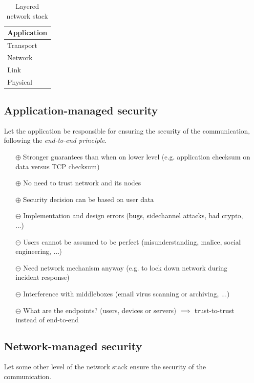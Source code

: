 \begin{table}[h]
\centering
\begin{tabular}{|l|}
\hline
Application \\ \hline
Transport \\ \hline
Network \\ \hline
Link \\ \hline
Physical \\
\hline
\end{tabular}
\caption{Layered network stack}
\end{table}


\subsection{Application-managed security}

Let the application be responsible for ensuring the security of the communication, following the \emph{end-to-end principle}.

\begin{itemize}
    \item[$\oplus$] Stronger guarantees than when on lower level (e.g. application checksum on data versus TCP checksum)
    \item[$\oplus$] No need to trust network and its nodes
    \item[$\oplus$] Security decision can be based on user data
    
    \item[$\ominus$] Implementation and design errors (bugs, sidechannel attacks, bad crypto, ...)
    \item[$\ominus$] Users cannot be assumed to be perfect (misunderstanding, malice, social engineering, ...)
    \item[$\ominus$] Need network mechanism anyway (e.g. to lock down network during incident response)
    \item[$\ominus$] Interference with middleboxes (email virus scanning or archiving, ...)
    \item[$\ominus$] What are the endpoints? (users, devices or servers) $\implies$ trust-to-trust instead of end-to-end
\end{itemize}


\subsection{Network-managed security}

Let some other level of the network stack ensure the security of the communication.

